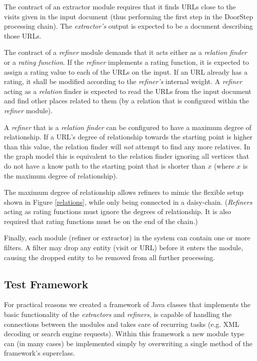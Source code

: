 \documentclass[a4paper,twoside]{danarticle}
\theoremstyle{remark}
\begin{document}
      The contract of 
      an extractor module requires that it finds URLs close to the visits given 
      in the input document (thus performing the first step in the DoorStep 
      processing chain). The \textit{extractor's} output is expected to be a 
      document describing those URLs. 
      
      The contract of a \textit{refiner} module 
      demands that it acts either as a \textit{relation finder} or a 
      \textit{rating function}. If the \textit{refiner} implements a rating 
      function, it is expected to assign a rating value to each of the URLs on 
      the input. If an URL already has a rating, it shall be modified according 
      to the \textit{refiner's} internal weight. A \textit{refiner} acting as a 
      \textit{relation} finder is expected to read the URLs from the input 
      document and find other places related to them (by a relation that is 
      configured within the \textit{refiner} module).
      
      A \textit{refiner} that is a \textit{relation finder} can be configured 
      to have a maximum degree of relationship. If a URL's degree of
      relationship towards the starting point is higher than this
      value, the relation finder will \emph{not} attempt to find
      any more relatives. In the graph model this is equivalent to the relation
      finder ignoring all vertices that do not have a know path to the starting
      point that is shorter than $ x $  (where $ x $ is the maximum degree of
      relationship).
      
      The maximum degree of relationship allows refiners to mimic the flexible 
      setup shown in 
      Figure \ref{relations}, while only being
      connected in a daisy-chain. (\textit{Refiners} acting as rating 
      functions must ignore the degrees of relationship. It is also required 
      that rating functions must be on the end of the chain.)
      
      Finally, each module (refiner or extractor) in the system can contain one
      or more 
      filters. A filter may drop any entity (visit or URL) before it enters the
      module, causing the dropped entity to be removed from all further
      processing.
    \subsection{Test Framework}
      For practical reasons we created a framework of Java classes that 
      implements the basic functionality of the \textit{extractors} and 
      \textit{refiners}, is capable of handling the connections between the 
      modules and takes care of recurring tasks (e.g. XML decoding or search 
      engine requests). Within this framework a new module type can (in many 
      cases) be implemented simply by overwriting a single method of the 
      framework's superclass.
      
\end{document}
